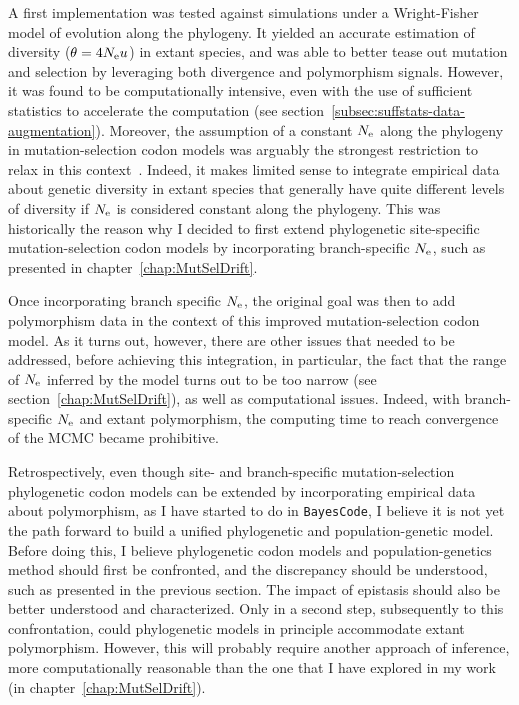 A first implementation was tested against simulations under a Wright-Fisher model of evolution along the phylogeny.
It yielded an accurate estimation of diversity ($\theta = 4 N_{\text{e}} u$) in extant species, and was able to better tease out mutation and selection by leveraging both divergence and polymorphism signals.
However, it was found to be computationally intensive, even with the use of sufficient statistics to accelerate the computation (see section~\ref{subsec:suffstats-data-augmentation}).
Moreover, the assumption of a constant $N_{\text{e}}$ along the phylogeny in mutation-selection codon models was arguably the strongest restriction to relax in this context~\citep{Rousselle2018}.
Indeed, it makes limited sense to integrate empirical data about genetic diversity in extant species that generally have quite different levels of diversity if $N_{\text{e}}$ is considered constant along the phylogeny.
This was historically the reason why I decided to first extend phylogenetic site-specific mutation-selection codon models by incorporating branch-specific $N_{\text{e}}$, such as presented in chapter~\ref{chap:MutSelDrift}.

Once incorporating branch specific $N_{\text{e}}$, the original goal was then to add polymorphism data in the context of this improved mutation-selection codon model.
As it turns out, however, there are other issues that needed to be addressed, before achieving this integration, in particular, the fact that the range of $N_{\text{e}}$ inferred by the model turns out to be too narrow (see section~\ref{chap:MutSelDrift}), as well as computational issues.
Indeed, with branch-specific $N_{\text{e}}$ and extant polymorphism, the computing time to reach convergence of the \acrshort{MCMC} became prohibitive.

Retrospectively, even though site- and branch-specific mutation-selection phylogenetic codon models can be extended by incorporating empirical data about polymorphism, as I have started to do in \texttt{BayesCode}, I believe it is not yet the path forward to build a unified phylogenetic and population-genetic model.
Before doing this, I believe phylogenetic codon models and population-genetics method should first be confronted, and the discrepancy should be understood, such as presented in the previous section.
The impact of epistasis should also be better understood and characterized.
Only in a second step, subsequently to this confrontation, could phylogenetic models in principle accommodate extant polymorphism.
However, this will probably require another approach of inference, more computationally reasonable than the one that I have explored in my work (in chapter~\ref{chap:MutSelDrift}).


